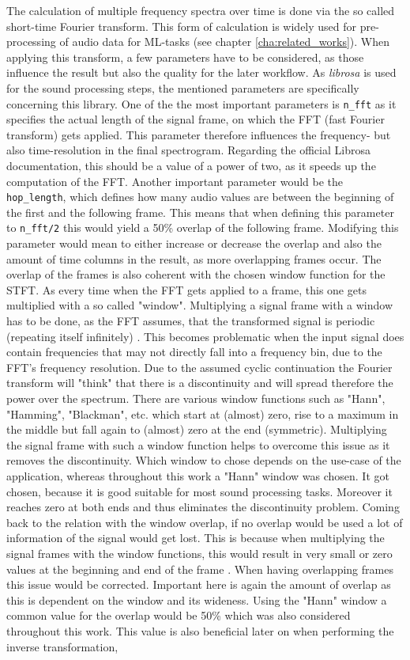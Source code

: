The calculation of multiple frequency spectra over time is done via the so called short-time Fourier transform. This form of calculation is widely used for pre-processing of audio data for ML-tasks (see chapter \ref{cha:related_works}). When applying this transform, a few parameters have to be considered, as those influence the result but also the quality for the later workflow. As \textit{librosa} is used for the sound processing steps, the mentioned parameters are specifically concerning this library. One of the the most important parameters is \texttt{n\_fft} as it specifies the actual length of the signal frame, on which the FFT (fast Fourier transform) gets applied. This parameter therefore influences the frequency- but also time-resolution in the final spectrogram. Regarding the official Librosa documentation, this should be a value of a power of two, as it speeds up the computation of the FFT. Another important parameter would be the \texttt{hop\_length}, which defines how many audio values are between the beginning of the first and the following frame. This means that when defining this parameter to \texttt{n\_fft/2} this would yield a 50\% overlap of the following frame. Modifying this parameter would mean to either increase or decrease the overlap and also the amount of time columns in the result, as more overlapping frames occur. The overlap of the frames is also coherent with the chosen window function for the STFT. As every time when the FFT gets applied to a frame, this one gets multiplied with a so called "window". Multiplying a signal frame with a window has to be done, as the FFT assumes, that the transformed signal is periodic (repeating itself infinitely) \cite{heinzel2002spectrum}. This becomes problematic when the input signal does contain frequencies that may not directly fall into a frequency bin, due to the FFT's frequency resolution. Due to the assumed cyclic continuation the Fourier transform will "think" that there is a discontinuity and will spread therefore the power over the spectrum. There are various window functions such as "Hann", "Hamming", "Blackman", etc. which start at (almost) zero, rise to a maximum in the middle but fall again to (almost) zero at the end (symmetric). Multiplying the signal frame with such a window function helps to overcome this issue as it removes the discontinuity. Which window to chose depends on the use-case of the application, whereas throughout this work a "Hann" window was chosen. It got chosen, because it is good suitable for most sound processing tasks. Moreover it reaches zero at both ends and thus eliminates the discontinuity problem. Coming back to the relation with the window overlap, if no overlap would be used a lot of information of the signal would get lost. This is because when multiplying the signal frames with the window functions, this would result in very small or zero values at the beginning and end of the frame \cite{heinzel2002spectrum}. When having overlapping frames this issue would be corrected. Important here is again the amount of overlap as this is dependent on the window and its wideness. Using the "Hann" window a common value for the overlap would be 50\% which was also considered throughout this work. This value is also beneficial later on when performing the inverse transformation, 